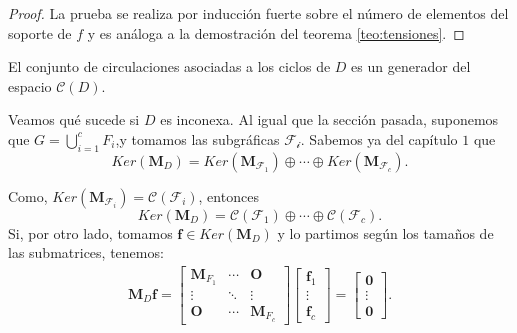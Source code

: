 \begin{proof}
La prueba se realiza por inducción fuerte sobre el número de elementos del soporte de $f$ y es análoga a la demostración del teorema \ref{teo:tensiones}.
\end{proof}

\begin{cor}
El conjunto de circulaciones asociadas a los ciclos de $D$ es un generador del espacio $\mathcal{C}(D)$.
\end{cor}

Veamos qué sucede si $D$ es inconexa. Al igual que la sección pasada, suponemos que $G =  \bigcup_{i=1}^{c}F_{i}$,y tomamos las subgráficas $\mathcal{F_{i}}$. Sabemos ya del capítulo $1$ que 
$$
Ker(\mathbf{M}_{D}) = Ker(\mathbf{M}_{\mathcal{F}_{1}}) \oplus \cdots \oplus Ker(\mathbf{M}_{\mathcal{F}_{c}}).
$$

Como,  $Ker(\mathbf{M}_{\mathcal{F}_{i}}) = \mathcal{C}(\mathcal{F}_{i})$, entonces $$Ker(\mathbf{M}_{D}) = \mathcal{C}(\mathcal{F}_{1}) \oplus \cdots \oplus \mathcal{C}(\mathcal{F}_{c}).$$ Si, por otro lado, tomamos $\mathbf{f} \in Ker(\mathbf{M}_{D})$ y lo partimos según los tamaños de las submatrices, tenemos:
\begin{align*}
    \mathbf{M}_{D}\mathbf{f} = \begin{bmatrix}
\mathbf{M}_{F_{1}} & \cdots  & \mathbf{O} \\ 
\vdots & \ddots  & \vdots \\ 
\mathbf{O} & \cdots & \mathbf{M}_{F_{c}}
\end{bmatrix} \begin{bmatrix}
\mathbf{f}_{1}\\
\vdots\\ 
\mathbf{f}_{c}
\end{bmatrix} = \begin{bmatrix}
\mathbf{0}\\
\vdots\\ 
\mathbf{0}
\end{bmatrix}.
\end{align*}

